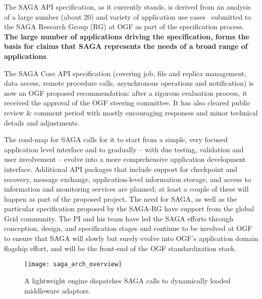 \documentclass[10pt,letterpaper]{article}
\newcommand{\up}{\vspace*{-0.25em}}
\begin{document}
The SAGA API specification, as it currently stands, is derived from an
analysis~\cite{saga-req} of a large number (about 20) and variety of 
application use cases~\cite{saga-uc} submitted to the SAGA Research
Group (RG) at OGF as part of the specification process.  {\bf The
  large number of applications driving the specification, forms the
  basis for claims that SAGA represents the needs of a broad range of
  applications}.

The SAGA Core API specification (covering job, file and replica
management, data access, remote procedure calls, 
asynchronous operations and notification) is now an OGF proposed
recommendation: after a rigorous evaluation process, it
received the approval of the OGF steering committee.  It has also
cleared public review \& comment period with mostly encouraging
responses and minor technical details and adjustments.

The road-map for SAGA calls for it to start from a simple, very
focused application level interface and to gradually -- with due
testing, validation and user involvement -- evolve into a more
comprehensive application development interface.  Additional API
packages %
that include support for checkpoint and recovery, message exchange,
application-level information storage, and access to information and
monitoring services are planned; at least a couple of these will
happen as part of the proposed project.  The need for SAGA, as well as
the particular specification proposed by the SAGA-RG have support from
the global Grid community.  The PI and his team have led the SAGA
efforts through conception, design, and specification stages and
continue to be involved at OGF to ensure that SAGA will slowly but
surely evolve into OGF's application domain flagship effort\cite{tsc},
and will be the front-end of the OGF standardization stack.

\begin{wrapfigure}{R}{0.6\textwidth}
  \vspace*{-1em}
  \texttt{[image: saga\_arch\_overview]}
  \caption{\label{fig:arch} \small {} A
    lightweight engine dispatches SAGA calls to dynamically loaded
    middleware adaptors.}
  \vspace*{-1em}
\end{wrapfigure}
\end{document}
